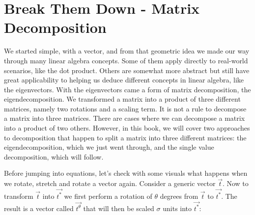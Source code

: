 \documentclass[600paper, 11pt,twoside,openany]{kdp}
\begin{document}
\chapter{Break Them Down - Matrix Decomposition}
\par 
\vspace{-3pt}
\indent We started simple, with a vector, and from that geometric idea we made our way through many linear algebra concepts. Some of them apply directly to real-world scenarios, like the dot product. Others are somewhat more abstract but still have great applicability to helping us deduce different concepts in linear algebra, like the eigenvectors. With the eigenvectors came a form of matrix decomposition, the eigendecomposition. We transformed a matrix into a product of three different matrices, namely two rotations and a scaling term. It is not a rule to decompose a matrix into three matrices. There are cases where we can decompose a matrix into a product of two others. However, in this book, we will cover two approaches to decomposition that happen to split a matrix into three different matrices: the eigendecomposition, which we just went through, and the single value decomposition, which will follow. 
\par 
\vspace{-3pt}
\indent
Before jumping into equations, let’s check with some visuals what happens when we rotate, stretch and rotate a vector again. Consider a generic vector $\overrightarrow{t}$. Now to transform $\overrightarrow{t}$ into $\overrightarrow{t^*}$ we first perform a rotation of $\theta$ degrees from $\overrightarrow{t}$ to $\overrightarrow{t^*}$. The result is a vector called $\overrightarrow{t^{\theta}}$ that will then be scaled  $\sigma$ units into $\overrightarrow{t^*}$:
\end{document}
